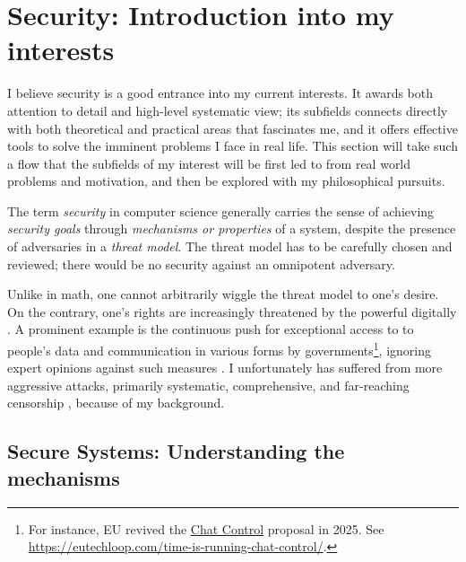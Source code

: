 \documentclass{article}
\begin{document}
\tableofcontents

\section{Security: Introduction into my interests}
I believe security is a good entrance into my current interests. It awards both
attention to detail and high-level systematic view; its subfields connects
directly with both theoretical and practical areas that fascinates me, and it
offers effective tools to solve the imminent problems I face in real life. This
section will take such a flow that the subfields of my interest will be first
led to from real world problems and motivation, and then be explored with my
philosophical pursuits.

The term \emph{security} in computer science generally carries the sense of
achieving \emph{security goals} through \emph{mechanisms or properties} of a
system, despite the presence of adversaries in a \emph{threat model}. The
threat model has to be carefully chosen and reviewed; there would be no
security against an omnipotent adversary.

Unlike in math, one cannot arbitrarily wiggle the threat model to one's desire.
On the contrary, one's rights are increasingly threatened by the
powerful digitally \cite{eu.digital.1, eu.digital.2, internet.shutdown.2024}. A
prominent example is the continuous push for exceptional access to to people's
data and communication in various forms by governments\footnote{ For instance,
	EU revived the \href{
https://eur-lex.europa.eu/legal-content/EN/TXT/?uri=COM\%3A2022\%3A209\%3AFIN}
{Chat Control} proposal in 2025. See \url{
https://eutechloop.com/time-is-running-chat-control/}.}, ignoring expert
opinions against such measures \cite{keys.under.doormats, bugs.in.our.pockets,
chatcontrolchildprotection}.
I unfortunately has suffered from more aggressive attacks, primarily
systematic, comprehensive, and far-reaching censorship \cite{internet.coup}
\cite[Sect.~5]{chall.censor.circum}, because of my background.

\subsection{Secure Systems: Understanding the mechanisms} 
\label{sec.secure.systems}
\end{document}
